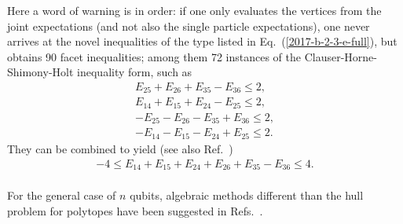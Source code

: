 %
%
%
%


Here a word of warning is in order: if one only evaluates the vertices from the joint expectations (and not also the single particle expectations),
one never arrives at the novel inequalities of the type listed in Eq.~(\ref{2017-b-2-3-e-full}),
but obtains
90 facet inequalities; among them 72
instances  of the Clauser-Horne-Shimony-Holt inequality form, such as
\begin{equation}
\begin{split}
   E_{25} +E_{26}    +E_{35}  -E_{36}  \le   2,            \\
 E_{14} +E_{15}    +E_{24}  -E_{25}          \le      2,      \\
  -E_{25} -E_{26}    -E_{35}  +E_{36}  \le   2,           \\
 -E_{14} -E_{15}    -E_{24}  +E_{25}          \le      2.
\end{split}
\label{2017-b-2-3-e}
\end{equation}
They can be combined to yield  (see also Ref.~\cite[p.~166, Eq.~(4)]{sliwa-2003})
\begin{equation}
\begin{split}
-4 \le   E_{14} + E_{15}    + E_{24}   + E_{26}    + E_{35}  - E_{36}  \le   4.            \\
\end{split}
\label{2017-b-2-3-enovel}
\end{equation}


For the general case of $n$ qubits, algebraic methods
different than the hull problem for polytopes have been suggested in Refs.~\cite{Werner-2001,Zukowski-02,Pitowsky-2002mbo,schachner-2003}.



